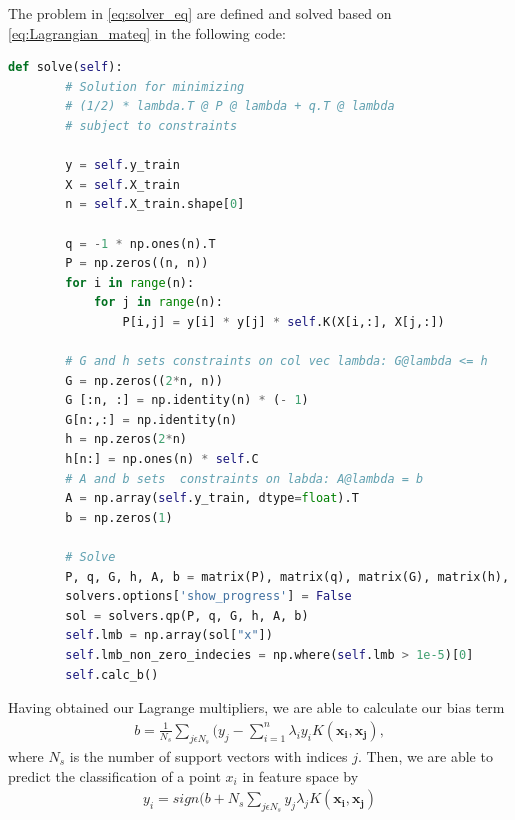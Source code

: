 The problem in \autoref{eq:solver_eq} are defined and solved based on \autoref{eq:Lagrangian_mateq}
in the following code:
\begin{lstlisting}[language=Python]
def solve(self):
        # Solution for minimizing 
        # (1/2) * lambda.T @ P @ lambda + q.T @ lambda 
        # subject to constraints

        y = self.y_train
        X = self.X_train
        n = self.X_train.shape[0]

        q = -1 * np.ones(n).T
        P = np.zeros((n, n))
        for i in range(n):
            for j in range(n):
                P[i,j] = y[i] * y[j] * self.K(X[i,:], X[j,:])
        
        # G and h sets constraints on col vec lambda: G@lambda <= h
        G = np.zeros((2*n, n))
        G [:n, :] = np.identity(n) * (- 1)
        G[n:,:] = np.identity(n)
        h = np.zeros(2*n)
        h[n:] = np.ones(n) * self.C
        # A and b sets  constraints on labda: A@lambda = b
        A = np.array(self.y_train, dtype=float).T
        b = np.zeros(1) 
    
        # Solve 
        P, q, G, h, A, b = matrix(P), matrix(q), matrix(G), matrix(h), matrix(A), matrix(b)
        solvers.options['show_progress'] = False
        sol = solvers.qp(P, q, G, h, A, b)
        self.lmb = np.array(sol["x"])
        self.lmb_non_zero_indecies = np.where(self.lmb > 1e-5)[0]
        self.calc_b()
\end{lstlisting}

Having obtained our Lagrange multipliers, we are able to calculate our bias term 
\begin{gather*}
b = \frac{1}{N_s}\sum_{j\epsilon N_s} (y_j-\sum_{i=1}^{n} \lambda _i y_i K(\boldsymbol{x_i,x_j}),
\end{gather*}
where $N_s$ is the number of support vectors with indices $j$.
Then, we are able to predict the classification of a point $x_i$ in feature space by 
\begin{gather*}
y_i = sign(b + {N_s}\sum_{j\epsilon N_s} y_j \lambda _j K(\boldsymbol{x_i,x_j})
\end{gather*}


